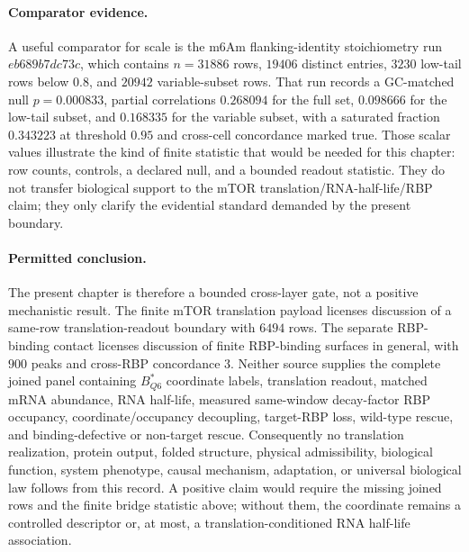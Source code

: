 \paragraph{Comparator evidence.}
A useful comparator for scale is the m6Am flanking-identity stoichiometry run $eb689b7dc73c$, which contains $n=31886$ rows, $19406$ distinct entries, $3230$ low-tail rows below $0.8$, and $20942$ variable-subset rows.  That run records a GC-matched null $p=0.000833$, partial correlations $0.268094$ for the full set, $0.098666$ for the low-tail subset, and $0.168335$ for the variable subset, with a saturated fraction $0.343223$ at threshold $0.95$ and cross-cell concordance marked true.  Those scalar values illustrate the kind of finite statistic that would be needed for this chapter: row counts, controls, a declared null, and a bounded readout statistic.  They do not transfer biological support to the mTOR translation/RNA-half-life/RBP claim; they only clarify the evidential standard demanded by the present boundary.

\paragraph{Permitted conclusion.}
The present chapter is therefore a bounded cross-layer gate, not a positive mechanistic result.  The finite mTOR translation payload licenses discussion of a same-row translation-readout boundary with $6494$ rows.  The separate RBP-binding contact licenses discussion of finite RBP-binding surfaces in general, with $900$ peaks and cross-RBP concordance $3$.  Neither source supplies the complete joined panel containing $B^{*}_{Q6}$ coordinate labels, translation readout, matched mRNA abundance, RNA half-life, measured same-window decay-factor RBP occupancy, coordinate/occupancy decoupling, target-RBP loss, wild-type rescue, and binding-defective or non-target rescue.  Consequently no translation realization, protein output, folded structure, physical admissibility, biological function, system phenotype, causal mechanism, adaptation, or universal biological law follows from this record.  A positive claim would require the missing joined rows and the finite bridge statistic above; without them, the coordinate remains a controlled descriptor or, at most, a translation-conditioned RNA half-life association.